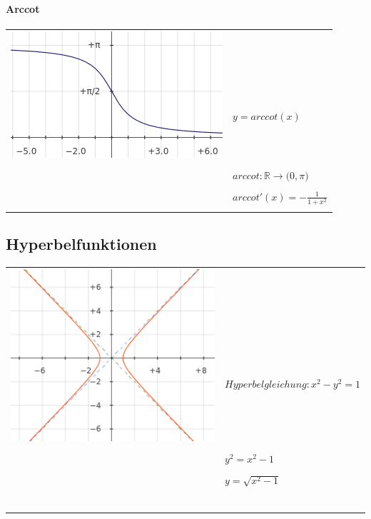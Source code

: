 \documentclass{article}
\begin{document}
\vspace{2ex}

\paragraph{Arccot}
\begin{tabular}{ l l }
\multirow{3}{*}{\includegraphics[scale=0.5]{png/arccot.png}} & \\ \\
 & $ y = arccot (x) $ \\ \\
 & $ arccot : \mathbb{R} \to \big(0, \pi \big)$ \\ \\
 & $ arccot'(x) = -\frac{1}{1+x^2} $ \\ \\
\hline
\end{tabular}

\newpage
\subsection{Hyperbelfunktionen\newline}

\begin{tabular}{ l l }
\multirow{3}{*}{\includegraphics[scale=0.5]{png/hyperbelfunc.png}} & \\ \\
 & $ Hyperbelgleichung : x^2 - y^2 = 1 $ \\ \\
 & $ y^2 = x^2 - 1 $ \\ \\
 & $ y = \sqrt{x^2 - 1} $ \\ \\ \\ \\ \\ \\ \\
\hline
\end{tabular}
\end{document}
